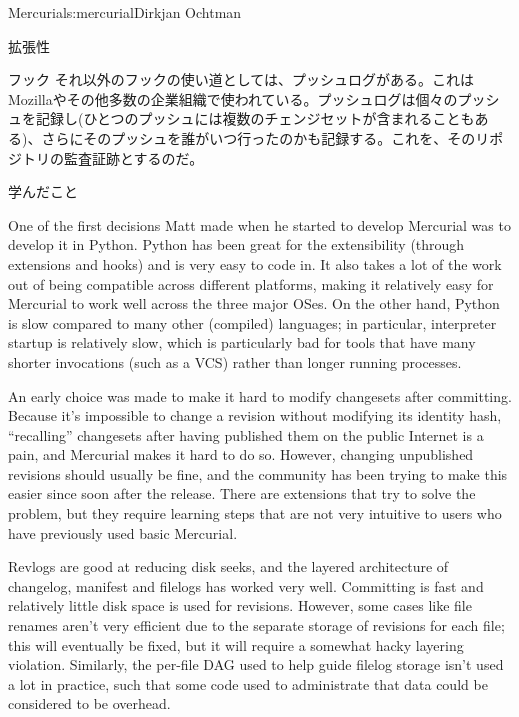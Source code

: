 \begin{aosachapter}{Mercurial}{s:mercurial}{Dirkjan Ochtman}
\begin{aosasect1}{拡張性}
\begin{aosasect2}{フック}
それ以外のフックの使い道としては、プッシュログがある。これはMozillaやその他多数の企業組織で使われている。プッシュログは個々のプッシュを記録し(ひとつのプッシュには複数のチェンジセットが含まれることもある)、さらにそのプッシュを誰がいつ行ったのかも記録する。これを、そのリポジトリの監査証跡とするのだ。

\end{aosasect2}

\end{aosasect1}

\begin{aosasect1}{学んだこと}

One of the first decisions Matt made when he started to develop
Mercurial was to develop it in Python. Python has been great for the
extensibility (through extensions and hooks) and is very easy to code
in. It also takes a lot of the work out of being compatible across
different platforms, making it relatively easy for Mercurial to work
well across the three major OSes. On the other hand, Python is slow
compared to many other (compiled) languages; in particular,
interpreter startup is relatively slow, which is particularly bad for
tools that have many shorter invocations (such as a VCS) rather than
longer running processes.

An early choice was made to make it hard to modify changesets after
committing. Because it's impossible to change a revision without
modifying its identity hash, ``recalling'' changesets after having
published them on the public Internet is a pain, and Mercurial makes
it hard to do so. However, changing unpublished revisions should
usually be fine, and the community has been trying to make this easier
since soon after the release. There are extensions that try to solve
the problem, but they require learning steps that are not very
intuitive to users who have previously used basic Mercurial.

Revlogs are good at reducing disk seeks, and the layered architecture
of changelog, manifest and filelogs has worked very well. Committing
is fast and relatively little disk space is used for revisions.
However, some cases like file renames aren't very efficient due to
the separate storage of revisions for each file; this will eventually
be fixed, but it will require a somewhat hacky layering violation.
Similarly, the per-file DAG used to help guide filelog storage isn't
used a lot in practice, such that some code used to administrate
that data could be considered to be overhead.


\end{aosasect1}
\end{aosachapter}
